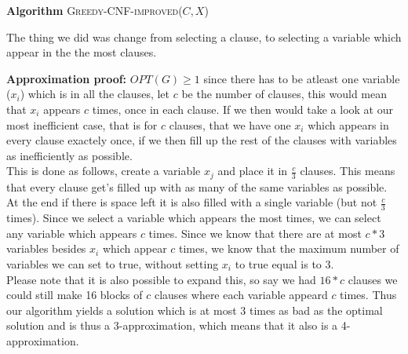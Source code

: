 \documentclass{article}
\begin{document}
\begin{itemize}
\begin{itemize}
\textbf{Algorithm} \textsc{Greedy-CNF-improved}($C,X$)
\begin{algorithmic}[1]
\ENDWHILE
{}
\end{algorithmic}
The thing we did was change from selecting a clause, to selecting a variable which appear in the the most clauses.

\textbf{Approximation proof:} $OPT(G)\ge 1$ since there has to be atleast one variable ($x_i$) which is in all the clauses, let $c$ be the number of clauses, this would mean that $x_i$ appears $c$ times, once in each clause. If we then would take a look at our most inefficient case, that is for $c$ clauses, that we have one $x_i$ which appears in every clause exactely once, if we then fill up the rest of the clauses with variables as inefficiently as possible. \\

This is done as follows, create a variable $x_j$ and place it in $\frac{c}{3}$ clauses. This means that every clause get's filled up with as many of the same variables as possible. At the end if there is space left it is also filled with a single variable (but not $\frac{c}{3}$ times). Since we select a variable which appears the most times, we can select any variable which appears $c$ times. Since we know that there are at most $c*3$ variables besides $x_i$ which appear $c$ times, we know that the maximum number of variables we can set to true, without setting $x_i$ to true equal is to 3. \\

Please note that it is also possible to expand this, so say we had $16*c$ clauses we could still make 16 blocks of $c$ clauses where each variable appeard $c$ times. Thus our algorithm yields a solution which is at most 3 times as bad as the optimal solution and is thus a 3-approximation, which means that it also is a 4-approximation.


\end{itemize}

\end{itemize}
\newpage
\end{document}
